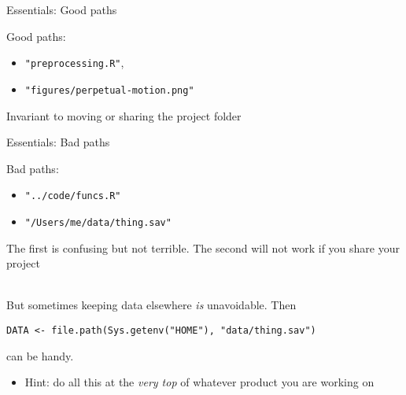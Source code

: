 \documentclass{hertieteaching}
\begin{document}
\begin{frame}[fragile]{Essentials: Good paths}

Good paths: 
\begin{itemize}
  \item \texttt{"preprocessing.R"}, 
  \item \texttt{"figures/perpetual-motion.png"}
\end{itemize}
Invariant to moving or sharing the project folder

\end{frame}
\begin{frame}[fragile]{Essentials: Bad paths}


Bad paths:
\begin{itemize}
  \item \texttt{"../code/funcs.R"}
  \item \texttt{"/Users/me/data/thing.sav"}
\end{itemize}

The first is confusing but not terrible. The second will not work if you share your project

~\\
But sometimes keeping data elsewhere \textit{is} unavoidable. Then
\begin{verbatim}
DATA <- file.path(Sys.getenv("HOME"), "data/thing.sav")
\end{verbatim}
can be handy. 
\begin{itemize}
  \item Hint: do all this at the \textit{very top} of whatever product you are working on
\end{itemize}

\end{frame}
\end{document}
